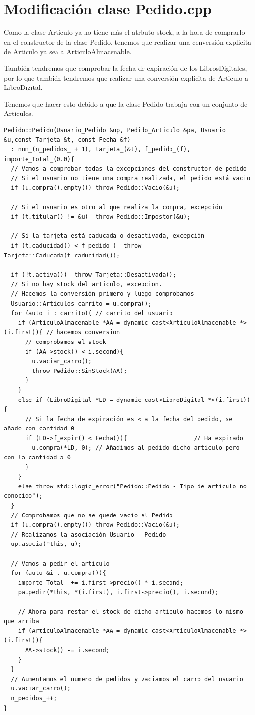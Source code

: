 \section{Modificación clase Pedido.cpp}
Como la clase Articulo ya no tiene más el atrbuto stock, a la hora de comprarlo en el constructor de la clase Pedido, tenemos que realizar una conversión explicita de Articulo ya sea a ArticuloAlmacenable.

También tendremos que comprobar la fecha de expiración de los LibrosDigitales, por lo que también tendremos que realizar una conversión explicita de Articulo a LibroDigital.

Tenemos que hacer esto debido a que la clase Pedido trabaja con un conjunto de Articulos.

\begin{verbatim}
Pedido::Pedido(Usuario_Pedido &up, Pedido_Articulo &pa, Usuario &u,const Tarjeta &t, const Fecha &f)
  : num_(n_pedidos_ + 1), tarjeta_(&t), f_pedido_(f), importe_Total_(0.0){
  // Vamos a comprobar todas la excepciones del constructor de pedido
  // Si el usuario no tiene una compra realizada, el pedido está vacio
  if (u.compra().empty()) throw Pedido::Vacio(&u);

  // Si el usuario es otro al que realiza la compra, excepción
  if (t.titular() != &u)  throw Pedido::Impostor(&u);

  // Si la tarjeta está caducada o desactivada, excepción
  if (t.caducidad() < f_pedido_)  throw Tarjeta::Caducada(t.caducidad());

  if (!t.activa())  throw Tarjeta::Desactivada();
  // Si no hay stock del articulo, excepcion.
  // Hacemos la conversión primero y luego comprobamos
  Usuario::Articulos carrito = u.compra();
  for (auto i : carrito){ // carrito del usuario
    if (ArticuloAlmacenable *AA = dynamic_cast<ArticuloAlmacenable *>(i.first)){ // hacemos conversion
      // comprobamos el stock
      if (AA->stock() < i.second){
        u.vaciar_carro();
        throw Pedido::SinStock(AA);
      }
    }
    else if (LibroDigital *LD = dynamic_cast<LibroDigital *>(i.first)){
      // Si la fecha de expiración es < a la fecha del pedido, se añade con cantidad 0
      if (LD->f_expir() < Fecha()){                   // Ha expirado
        u.compra(*LD, 0); // Añadimos al pedido dicho articulo pero con la cantidad a 0
      }
    }
    else throw std::logic_error("Pedido::Pedido - Tipo de articulo no conocido");
  }
  // Comprobamos que no se quede vacio el Pedido
  if (u.compra().empty()) throw Pedido::Vacio(&u);
  // Realizamos la asociación Usuario - Pedido
  up.asocia(*this, u);

  // Vamos a pedir el articulo
  for (auto &i : u.compra()){
    importe_Total_ += i.first->precio() * i.second;
    pa.pedir(*this, *(i.first), i.first->precio(), i.second);

    // Ahora para restar el stock de dicho articulo hacemos lo mismo que arriba
    if (ArticuloAlmacenable *AA = dynamic_cast<ArticuloAlmacenable *>(i.first)){
      AA->stock() -= i.second;
    }
  }
  // Aumentamos el numero de pedidos y vaciamos el carro del usuario
  u.vaciar_carro();
  n_pedidos_++;
}
\end{verbatim}